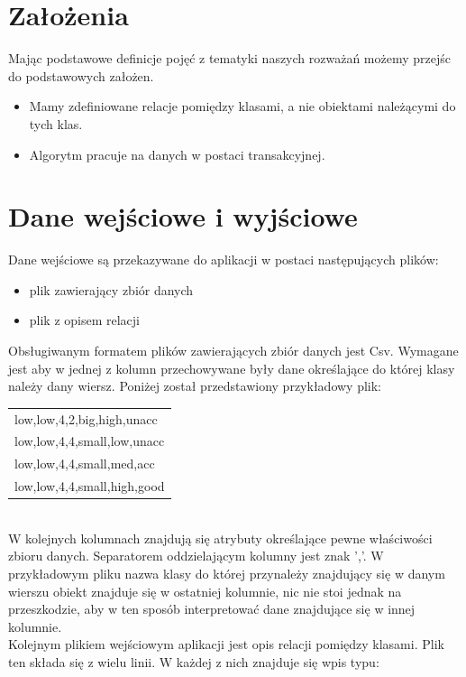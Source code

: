 \documentclass[a4paper,12pt]{article}
\begin{document}
\section{Założenia}


Mając podstawowe definicje pojęć z tematyki naszych rozważań możemy przejśc do podstawowych założen. \\
\begin{itemize}
\item Mamy zdefiniowane relacje pomiędzy klasami, a nie obiektami należącymi do tych klas.
\item Algorytm pracuje na danych w postaci transakcyjnej.
\end{itemize}

\section{Dane wejściowe i wyjściowe}
\label{opis_danych}
Dane wejściowe są przekazywane do aplikacji w postaci następujących plików:
\begin{itemize}
\item plik zawierający zbiór danych
\item plik z opisem relacji
\end{itemize}
Obsługiwanym formatem plików zawierających zbiór danych jest Csv. Wymagane jest aby w jednej z kolumn przechowywane były dane określające do której klasy należy dany wiersz. Poniżej został przedstawiony przykładowy plik: \\

\begin{tabular}{l}
low,low,4,2,big,high,unacc \\
low,low,4,4,small,low,unacc \\
low,low,4,4,small,med,acc \\
low,low,4,4,small,high,good \\
\end{tabular}
\\

W kolejnych kolumnach znajdują się atrybuty określające pewne właściwości zbioru danych. Separatorem oddzielającym kolumny jest znak ','. W przykładowym pliku nazwa klasy do której przynależy znajdujący się w danym wierszu obiekt znajduje się w ostatniej kolumnie, nic nie stoi jednak na przeszkodzie, aby w ten sposób interpretować dane znajdujące się w innej kolumnie. \\

Kolejnym plikiem wejściowym aplikacji jest opis relacji pomiędzy klasami. Plik ten składa się z wielu linii. W każdej z nich znajduje się wpis typu:\\
\end{document}
